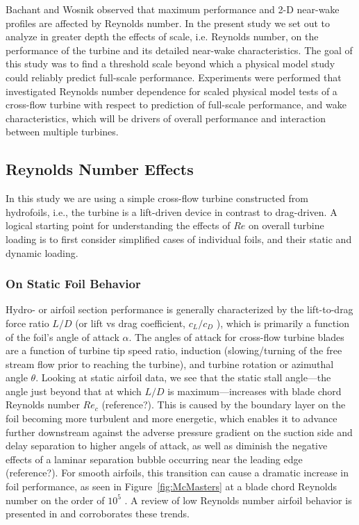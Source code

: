 \documentclass[energies,article,accept,moreauthors,pdftex,12pt,a4paper]{mdpi}
\begin{document}
Bachant and Wosnik \cite{Bachant2014} observed that maximum performance and 2-D 
near-wake profiles are affected by Reynolds number. In the present study we set 
out to analyze in greater depth the effects of scale, i.e. Reynolds number, on 
the performance of the turbine and its detailed near-wake 
characteristics. 
The goal of this study was to find a threshold scale beyond which a physical 
model study could reliably predict full-scale performance. 
Experiments were performed that investigated Reynolds number dependence for 
scaled physical model tests of a cross-flow turbine with respect
to prediction of full-scale performance, and wake characteristics, which will be
drivers of overall performance and interaction between multiple 
turbines.



\subsection{Reynolds Number Effects}

In this study we are using a simple cross-flow turbine constructed from 
hydrofoils, i.e., the 
turbine is a lift-driven device in contrast to drag-driven. A logical starting 
point for understanding the effects of $Re$ on overall turbine loading is to 
first consider simplified cases of individual foils, and their static and 
dynamic loading. 

\subsubsection{On Static Foil Behavior}

Hydro- or airfoil section performance is generally characterized by the 
lift-to-drag 
force ratio $L/D$  (or lift vs drag coefficient, $c_L/c_D$ ),
which is primarily a function of the foil's angle of attack $\alpha$. The 
angles of attack
for cross-flow turbine blades are a function of turbine tip speed ratio,
induction (slowing/turning of the free stream flow prior to reaching the
turbine), and turbine rotation or azimuthal angle $\theta$. Looking at static
airfoil data, we see that the static stall angle---the angle just beyond that at
which $L/D$ is maximum---increases with blade chord Reynolds number $Re_c$ 
(reference?). This
is caused by the boundary layer on the foil becoming more turbulent and more 
energetic, which enables it to advance further downstream against the adverse 
pressure gradient on the suction side and delay separation to higher angels of 
attack, as well as diminish the negative effects of a laminar separation
bubble occurring near the leading edge (reference?). For smooth airfoils, this 
transition can
cause a dramatic increase in foil performance, as seen in
Figure~\ref{fig:McMasters} at a blade chord Reynolds number on the order of
$10^5$ \cite{McMasters1980}. A review of low Reynolds number airfoil behavior is
presented in \cite{Lissaman1983} and corroborates these trends.
\end{document}

